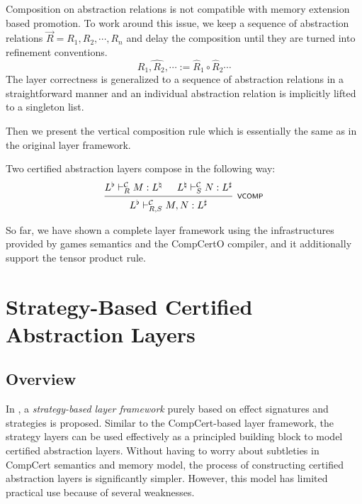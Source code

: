 \documentclass[acmsmall,review,anonymous]{acmart}\settopmatter{printfolios=true,printccs=false,printacmref=false}
\begin{document}
Composition on abstraction relations
is not compatible with
memory extension based promotion\cite[\S4.4]{thesis}.
To work around this issue,
we keep a sequence of abstraction relations
$\vec{R} = R_1, R_2, \cdots, R_n$
and delay the composition
until they are turned into refinement conventions.
\[
  \widehat{R_1, R_2, \cdots} :=
  \hat{R}_1 \circ \hat{R}_2 \cdots
\]
The layer correctness
is generalized to a sequence of
abstraction relations
in a straightforward manner
and an individual abstraction relation
is implicitly lifted to a singleton list.

Then we present the vertical composition rule
which is essentially the same as
in the original layer framework.

\begin{theorem}
  Two certified abstraction layers compose
  in the following way:
  \[
    \begin{prooftree}
      \hypo{L^\flat \vdash^\mathcal{C}_{R} M : L^\natural}
      \hypo{L^\natural \vdash^\mathcal{C}_{S} N : L^\sharp}
      \infer2[\scriptsize\kw{VCOMP}]{L^\flat \vdash^\mathcal{C}_{R,S} M, N : L^\sharp}
    \end{prooftree}
  \]
\end{theorem}

So far,
we have shown a complete layer framework
using the infrastructures
provided by games semantics and the CompCertO compiler,
and it additionally
support the tensor product rule.



\section{Strategy-Based Certified Abstraction Layers} \label{sec:rbgs-cal} %

\subsection{Overview}

In \citet{rbgs-cal},
a \emph{strategy-based layer framework}
purely based on
effect signatures and strategies is proposed.
Similar to the CompCert-based layer framework,
the strategy layers can be used effectively
as a principled building block
to model certified abstraction layers.
Without having to worry about
subtleties in CompCert semantics and memory model,
the process of constructing certified abstraction layers
is significantly simpler.
However,
this model has limited practical use
because of several weaknesses.
\end{document}
